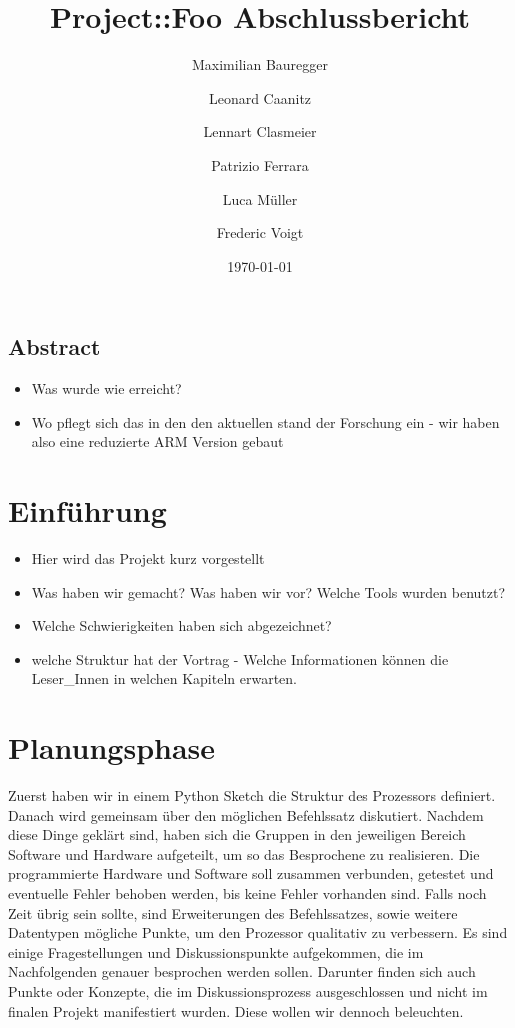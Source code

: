 \documentclass[paper=a4,fontsize=12pt,twocolumn]{scrreprt}
\title{Project::Foo Abschlussbericht}
\author{Maximilian Bauregger \and Leonard Caanitz \and Lennart Clasmeier \and Patrizio Ferrara \and Luca Müller \and Frederic Voigt}
\date{\today}
\begin{document}
\maketitle

\tableofcontents

\section*{Abstract}

\begin{itemize}
    \item Was wurde wie erreicht?
    \item Wo pflegt sich das in den den aktuellen stand der Forschung ein - wir haben also eine reduzierte ARM Version gebaut
\end{itemize}
\kant[1]


\chapter{Einführung}
\begin{itemize}
    \item Hier wird das Projekt kurz vorgestellt
    \item Was haben wir gemacht? Was haben wir vor? Welche Tools wurden benutzt?
    \item Welche Schwierigkeiten haben sich abgezeichnet?
    \item welche Struktur hat der Vortrag - Welche Informationen können die Leser\_Innen in welchen Kapiteln erwarten.
\end{itemize}
\kant[2-3]

\chapter{Planungsphase}
Zuerst haben wir in einem Python Sketch die Struktur des Prozessors definiert.
Danach wird gemeinsam über den möglichen Befehlssatz diskutiert.
Nachdem diese Dinge geklärt sind, haben sich die Gruppen in den jeweiligen Bereich Software und Hardware aufgeteilt, um so das Besprochene zu realisieren.
Die programmierte Hardware und Software soll zusammen verbunden, getestet und eventuelle Fehler behoben werden, bis keine Fehler vorhanden sind.
Falls noch Zeit übrig sein sollte, sind Erweiterungen des Befehlssatzes, sowie weitere Datentypen mögliche Punkte, um den Prozessor qualitativ zu verbessern.
Es sind einige Fragestellungen und Diskussionspunkte aufgekommen, die im Nachfolgenden genauer besprochen werden sollen.
Darunter finden sich auch Punkte oder Konzepte, die im Diskussionsprozess ausgeschlossen und nicht im finalen Projekt manifestiert wurden.
Diese wollen wir dennoch beleuchten.
\end{document}

